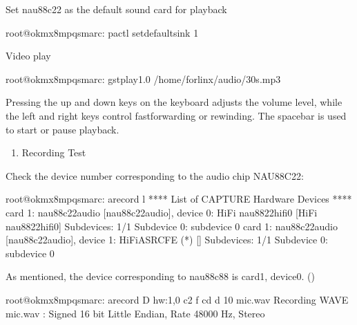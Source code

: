 \documentclass[letterpaper,10pt,openany,english]{sphinxmanual}
\begin{document}
\sphinxAtStartPar
Set nau88c22 as the default sound card for playback

\begin{sphinxVerbatim}[commandchars=\\\{\}]
root@ok\PYGZhy{}mx8mpq\PYGZhy{}smarc:\PYGZti{}\PYGZsh{} pactl set\PYGZhy{}default\PYGZhy{}sink 1
\end{sphinxVerbatim}

\sphinxAtStartPar
Video play

\begin{sphinxVerbatim}[commandchars=\\\{\}]
root@ok\PYGZhy{}mx8mpq\PYGZhy{}smarc:\PYGZti{}\PYGZsh{} gst\PYGZhy{}play\PYGZhy{}1.0 /home/forlinx/audio/30s.mp3
\end{sphinxVerbatim}

\sphinxAtStartPar
Pressing the up and down keys on the keyboard adjusts the volume level, while the left and right keys control fast\sphinxhyphen{}forwarding or rewinding. The spacebar is used to start or pause playback.
\begin{enumerate}
%
\setcounter{enumi}{2}
\item {} 
\sphinxAtStartPar
Recording Test

\end{enumerate}

\sphinxAtStartPar
Check the device number corresponding to the audio chip NAU88C22:

\begin{sphinxVerbatim}[commandchars=\\\{\}]
root@ok\PYGZhy{}mx8mpq\PYGZhy{}smarc:\PYGZti{}\PYGZsh{} arecord \PYGZhy{}l
**** List of CAPTURE Hardware Devices ****
card 1: nau88c22audio [nau88c22\PYGZhy{}audio], device 0: HiFi nau8822\PYGZhy{}hifi\PYGZhy{}0 [HiFi nau8822\PYGZhy{}hifi\PYGZhy{}0]
  Subdevices: 1/1
  Subdevice \PYGZsh{}0: subdevice \PYGZsh{}0
card 1: nau88c22audio [nau88c22\PYGZhy{}audio], device 1: HiFi\PYGZhy{}ASRC\PYGZhy{}FE (*) []
  Subdevices: 1/1
  Subdevice \PYGZsh{}0: subdevice \PYGZsh{}0
\end{sphinxVerbatim}

\sphinxAtStartPar
As mentioned, the device corresponding to nau88c88 is card1, device0. ()

\begin{sphinxVerbatim}[commandchars=\\\{\}]
root@ok\PYGZhy{}mx8mpq\PYGZhy{}smarc:\PYGZti{}\PYGZsh{} arecord \PYGZhy{}D hw:1,0 \PYGZhy{}c2 \PYGZhy{}f cd \PYGZhy{}d 10 mic.wav
Recording WAVE \PYGZsq{}mic.wav\PYGZsq{} : Signed 16 bit Little Endian, Rate 48000 Hz, Stereo
\end{sphinxVerbatim}
\end{document}
